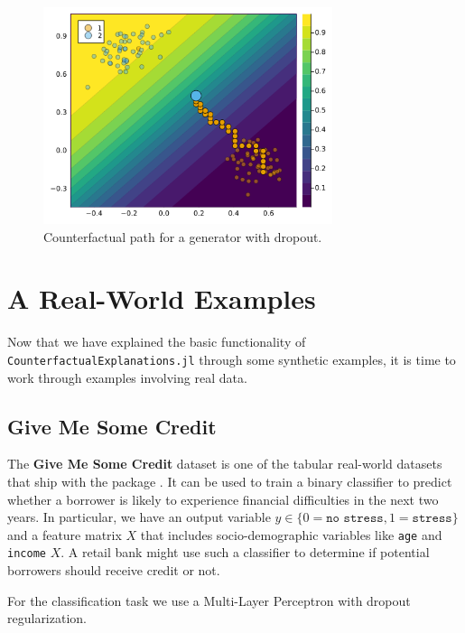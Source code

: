 \documentclass{juliacon}
\begin{document}
\begin{figure}

{\centering \includegraphics[width=3.33333in,height=2.5in]{www/dropout.png}

}

\caption{\label{fig-dropout}Counterfactual path for a generator with
dropout.}

\end{figure}

\hypertarget{sec-emp}{%
\section{A Real-World Examples}\label{sec-emp}}

Now that we have explained the basic functionality of
\texttt{CounterfactualExplanations.jl} through some synthetic examples,
it is time to work through examples involving real data.

\hypertarget{give-me-some-credit}{%
\subsection{Give Me Some Credit}\label{give-me-some-credit}}

The \textbf{Give Me Some Credit} dataset is one of the tabular
real-world datasets that ship with the package \cite{kaggle2011give}. It
can be used to train a binary classifier to predict whether a borrower
is likely to experience financial difficulties in the next two years. In
particular, we have an output variable
\(y \in \{0=\texttt{no stress},1=\texttt{stress}\}\) and a feature
matrix \(X\) that includes socio-demographic variables like \texttt{age}
and \texttt{income} \(X\). A retail bank might use such a classifier to
determine if potential borrowers should receive credit or not.

For the classification task we use a Multi-Layer Perceptron with dropout
regularization.
\end{document}
